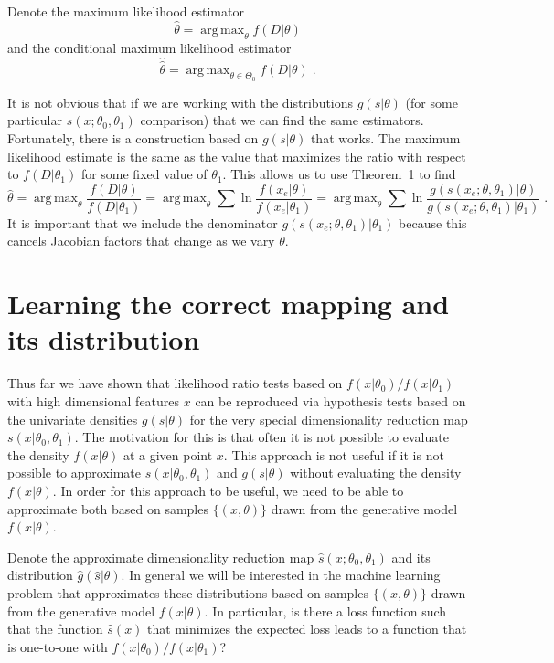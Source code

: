 \documentclass[11pt, oneside]{article}   	%
\DeclareMathOperator*{\argmax}{arg\,max}
\begin{document}
Denote the maximum likelihood estimator
\begin{equation}\label{eq:mle}
\hat{\theta} = \argmax_\theta  f(D | \theta)
\end{equation}
and the conditional maximum likelihood estimator
\begin{equation}
\hat{\hat{\theta}} = \argmax_{\theta \in \Theta_0}  f(D | \theta) \; .
\end{equation}

It is not obvious that if we are working with the distributions $g(s|\theta)$ (for some particular $s(x; \theta_0, \theta_1)$ comparison) that we can find the same estimators. 
Fortunately, there is a construction based on $g(s|\theta)$ that works. The maximum likelihood estimate is the same as the value that maximizes the ratio with respect to $f(D|\theta_1)$ for some fixed value of $\theta_1$. This allows us to use Theorem~1 to find
\begin{equation}
\hat{\theta} = \argmax_\theta \frac{ f(D | \theta)}{ f(D | \theta_1)} = \argmax_\theta  \sum \ln \frac{f(x_e | \theta)}{f(x_e|\theta_1)} = \argmax_\theta  \sum \ln \frac{g(s(x_e; \theta, \theta_1) | \theta)}{g(s(x_e; \theta, \theta_1) |\theta_1)} \; .
\end{equation}
It is important that we include the denominator $g(s(x_e; \theta, \theta_1) |\theta_1)$ because this cancels Jacobian factors that change as we vary $\theta$.

\section{Learning the correct mapping and its distribution}

Thus far we have shown that likelihood ratio tests based on $f(x|\theta_0)/f(x|\theta_1)$ with high dimensional features $x$ can be reproduced via hypothesis tests based on the univariate densities $g(s|\theta)$ for the very special dimensionality reduction map $s(x|\theta_0, \theta_1)$. The motivation for this is that often it is not possible to evaluate the density $f(x|\theta)$ at a given point $x$.  This approach is not useful if it is not possible to approximate $s(x|\theta_0, \theta_1)$ and $g(s|\theta)$ without evaluating the density $f(x|\theta)$. In order for this approach to be useful, we need to be able to approximate both based on samples $\{(x,\theta)\}$ drawn from the generative model $f(x|\theta)$.  

Denote the approximate dimensionality reduction map $\hat{s}(x; \theta_0, \theta_1)$ and its distribution $\hat{g}(\hat{s}|\theta)$. In general we will be interested in the machine learning problem that approximates these distributions based on samples $\{(x, \theta)\}$ drawn from the generative model $f(x|\theta)$.  In particular, 
is there a loss function such that the function $\hat{s}(x)$ that minimizes the expected loss leads to a function
that is one-to-one with $f(x|\theta_0)/f(x|\theta_1)$?
\end{document}
